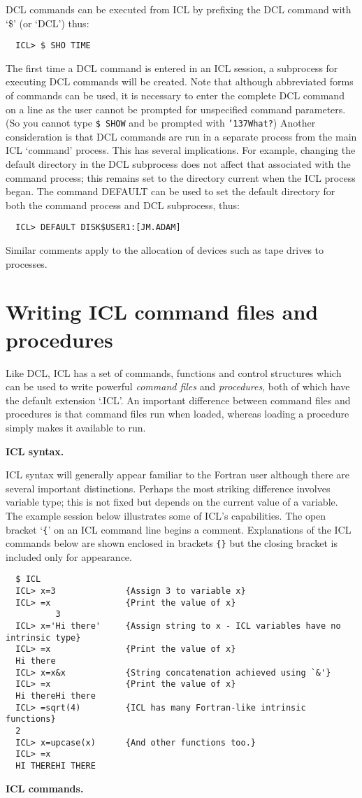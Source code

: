 \documentclass[twoside,11pt]{article}
\renewcommand{\_}{{\tt\char'137}}
\newcommand{\xlabel}[1]{}
\begin{document}
DCL  commands can be executed from ICL by prefixing the DCL command with
`\$' (or `DCL') thus:
\begin{verbatim}
  ICL> $ SHO TIME
\end{verbatim}
The first time a DCL command is entered in an ICL session, a subprocess
for executing DCL commands will be created.
Note that although abbreviated forms of commands can be used, it is
necessary to enter the complete DCL command on a line
as the user  cannot be prompted for unspecified command parameters.
(So you cannot type {\tt \$ SHOW} and be prompted with {\tt \_What?})
Another consideration is that DCL commands are run in a separate
process from the main ICL `command' process. This has several
implications. For example, changing the default directory in the DCL
subprocess does not affect that associated with the command process; this
remains set to
the directory current when the ICL process began.
The command DEFAULT can be used to set the default directory for
both the command process and DCL
subprocess, thus:
\begin{verbatim}
  ICL> DEFAULT DISK$USER1:[JM.ADAM]
\end{verbatim}
Similar comments apply to the allocation of devices such as tape drives
to processes.

\newpage
\section{Writing ICL command files and procedures\label{procs}\xlabel{writing_icl_command_files_and_procedures}}

Like DCL, ICL has a set of commands, functions and control structures which
can be used to write powerful {\sl command files\/} and {\sl procedures},
both of which have the default extension `.ICL'.
An important difference between command files and procedures
is that command files run when loaded, whereas loading a procedure
simply makes it available to run.


{\smallskip\large\bf ICL syntax.}

ICL syntax will generally appear familiar to the Fortran user although there
are several important distinctions.
Perhaps the most striking difference involves variable type; this
is not fixed but depends on the current value of a variable.
The example session below illustrates some of ICL's capabilities.
The open bracket `{\tt\{}' on an ICL command line  begins a comment.
Explanations of the ICL commands below are shown enclosed in brackets
{\tt \{\}}  but the closing bracket is included only for appearance.
\begin{verbatim}
  $ ICL
  ICL> x=3              {Assign 3 to variable x}
  ICL> =x               {Print the value of x}
          3
  ICL> x='Hi there'     {Assign string to x - ICL variables have no intrinsic type}
  ICL> =x               {Print the value of x}
  Hi there
  ICL> x=x&x            {String concatenation achieved using `&'}
  ICL> =x               {Print the value of x}
  Hi thereHi there
  ICL> =sqrt(4)         {ICL has many Fortran-like intrinsic functions}
  2
  ICL> x=upcase(x)      {And other functions too.}
  ICL> =x
  HI THEREHI THERE
\end{verbatim}
{\smallskip\large\bf ICL commands.}
\end{document}
